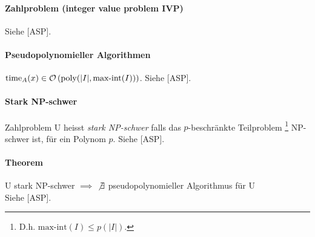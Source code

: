 \paragraph{Zahlproblem (integer value problem IVP)}
Siehe [ASP].

\paragraph{Pseudopolynomieller Algorithmen}
$\text{time}_A(x) \in \mathcal{O} \left( \text{poly}( |I|, \text{max-int}(I) ) \right)$.
Siehe [ASP].

\paragraph{Stark NP-schwer}
Zahlproblem U heisst \emph{stark NP-schwer} falls das $p$-beschränkte Teilproblem%
\footnote{D.h. $\text{max-int}(I) \leq p(|I|)$.} NP-schwer ist, für ein Polynom $p$.
Siehe [ASP].

\paragraph{Theorem}
U stark NP-schwer $\implies$ $\not \exists$ pseudopolynomieller Algorithmus für U\\
Siehe [ASP].
